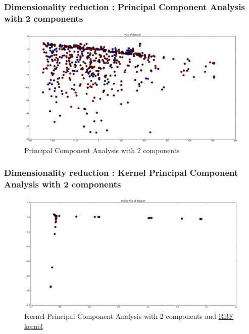 \documentclass[10pt,handout,english]{beamer}
\begin{document}
		\begin{frame}
		\frametitle{Dimensionality reduction : Principal Component Analysis with 2 components}
			\begin{figure}[h!]
            	\centering
                \includegraphics[width=\textwidth]{pca.png}
                \caption{Principal Component Analysis with 2 components}
			\end{figure}
		\end{frame}

		\begin{frame}
		\frametitle{Dimensionality reduction : Kernel Principal Component Analysis with 2 components}
			\begin{figure}[h!]
            	\centering
                \includegraphics[width=\textwidth]{kernel_pca.png}
                \caption{Kernel Principal Component Analysis with 2 components and \href{http://scikit-learn.org/stable/modules/metrics.html\#metrics}{RBF kernel}}
			\end{figure}
		\end{frame}
\end{document}
